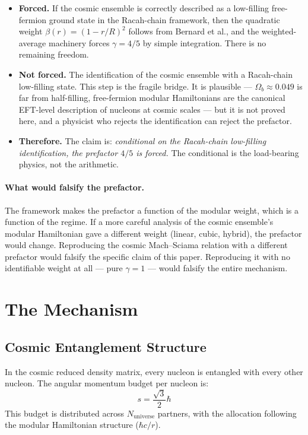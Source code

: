 \documentclass[11pt,letterpaper]{article}
\newcommand{\Nuniv}{N_{\mathrm{universe}}}
\begin{document}
\begin{itemize}
  \item \textbf{Forced.} If the cosmic ensemble is correctly
    described as a low-filling free-fermion ground state in the
    Racah-chain framework, then the quadratic weight
    $\beta(r) = (1-r/R)^2$ follows from Bernard et al., and the
    weighted-average machinery forces $\gamma = 4/5$ by simple
    integration. There is no remaining freedom.
  \item \textbf{Not forced.} The identification of the cosmic
    ensemble with a Racah-chain low-filling state. This step is the
    fragile bridge. It is plausible --- $\Omega_b \approx 0.049$ is
    far from half-filling, free-fermion modular Hamiltonians are
    the canonical EFT-level description of nucleons at cosmic scales
    --- but it is not proved here, and a physicist who rejects the
    identification can reject the prefactor.
  \item \textbf{Therefore.} The claim is: \emph{conditional on the
    Racah-chain low-filling identification, the prefactor $4/5$ is
    forced.} The conditional is the load-bearing physics, not the
    arithmetic.
\end{itemize}

\paragraph{What would falsify the prefactor.}
The framework makes the prefactor a function of the modular weight,
which is a function of the regime. If a more careful analysis of
the cosmic ensemble's modular Hamiltonian gave a different weight
(linear, cubic, hybrid), the prefactor would change. Reproducing
the cosmic Mach--Sciama relation with a different prefactor would
falsify the specific claim of this paper. Reproducing it with no
identifiable weight at all --- pure $\gamma = 1$ --- would falsify
the entire mechanism.

\section{The Mechanism}

\subsection{Cosmic Entanglement Structure}

In the cosmic reduced density matrix, every nucleon is entangled with every
other nucleon. The angular momentum budget per nucleon is:
\begin{equation}
  s = \frac{\sqrt{3}}{2} \hbar
  \label{eq:spin_budget}
\end{equation}
This budget is distributed across $\Nuniv$ partners, with the
allocation following the modular Hamiltonian structure ($\hbar c/r$).
\end{document}
